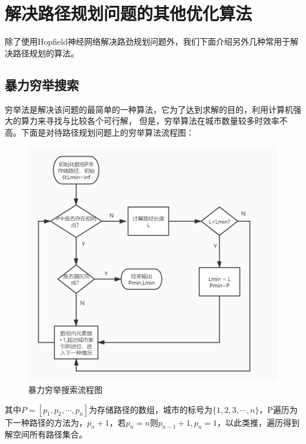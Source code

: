 \chapter{解决路径规划问题的其他优化算法}
除了使用Hopfield神经网络解决路劲规划问题外，我们下面介绍另外几种常用于解决路径规划的算法。
\section{暴力穷举搜索}
穷举法是解决该问题的最简单的一种算法，它为了达到求解的目的，利用计算机强大的算力来寻找与比较各个可行解，
但是，穷举算法在城市数量较多时效率不高。下面是对待路径规划问题上的穷举算法流程图：\\
\begin{figure}[H]
    \centering
    \includegraphics[width=13cm]{figure/blqj.jpg}
    \caption{暴力穷举搜索流程图}
    \label{fig-blqj}%
\end{figure}
\par
其中$P=[p_1,p_2,\cdots,p_n]$为存储路径的数组，城市的标号为$\{1,2,3,\cdots, n\}$，P遍历为下一种路径的方法为，$p_n + 1$，若$p_n = n$则$p_{n-1}+1,p_n=1$，以此类推，遍历得到解空间所有路径集合。
